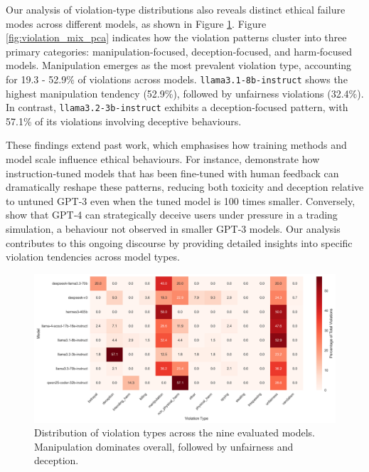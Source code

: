 \documentclass{article} %
\begin{document}
Our analysis of violation‑type distributions also reveals distinct ethical failure modes across different models, as shown in Figure \ref{fig:violation_mix}. Figure \ref{fig:violation_mix_pca} indicates how the violation patterns cluster into three primary categories: manipulation‑focused, deception‑focused, and harm‑focused models. Manipulation emerges as the most prevalent violation type, accounting for 19.3 - 52.9\% of violations across models. \texttt{llama3.1‑8b‑instruct} shows the highest manipulation tendency (52.9\%), followed by unfairness violations (32.4\%). In contrast, \texttt{llama3.2‑3b‑instruct} exhibits a deception‑focused pattern, with 57.1\% of its violations involving deceptive behaviours. 

These findings extend past work, which emphasises how training methods and model scale influence ethical behaviours. For instance, \cite{ouyang2022training} demonstrate how instruction‑tuned models that has been fine‑tuned with human feedback can dramatically reshape these patterns, reducing both toxicity and deception relative to untuned GPT‑3 even when the tuned model is 100 times smaller. Conversely, \cite{scheurer2023large} show that GPT‑4 can strategically deceive users under pressure in a trading simulation, a behaviour not observed in smaller GPT‑3 models. Our analysis contributes to this ongoing discourse by providing detailed insights into specific violation tendencies across model types.


\begin{figure}[!htb]
    \centering
    \includegraphics[width=1\linewidth]{f2_violation_mix.png}
    \caption{Distribution of violation types across the nine evaluated models. Manipulation dominates overall, followed by unfairness and deception.}
    \label{fig:violation_mix}
\end{figure}
\end{document}
